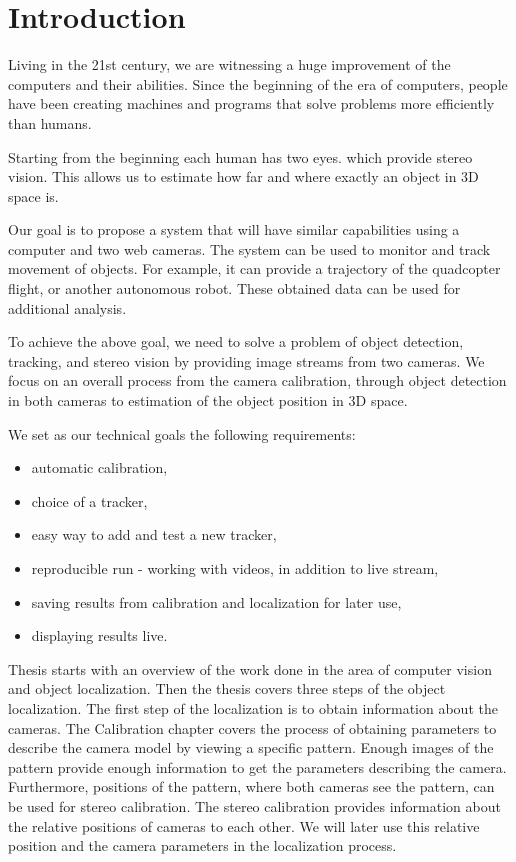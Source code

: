 \chapter*{Introduction}

Living in the 21st century, we are witnessing a huge improvement of the
computers and their abilities. Since the beginning of the era of computers,
people have been creating machines and programs that solve problems more
efficiently than humans.

Starting from the beginning each human has two eyes. which provide stereo
vision. This allows us to estimate how far and where exactly an object in 3D
space is.

Our goal is to propose a system that will have similar capabilities using a
computer and two web cameras. The system can be used to monitor and track
movement of objects. For example, it can provide a trajectory of the quadcopter
flight, or another autonomous robot. These obtained data can be used for
additional analysis.

To achieve the above goal, we need to solve a problem of object detection,
tracking, and stereo vision by providing image streams from two cameras. We
focus on an overall process from the camera calibration, through object
detection in both cameras to estimation of the object position in 3D space.

We set as our technical goals the following requirements:
\begin{itemize}
\item automatic calibration,
\item choice of a tracker,
\item easy way to add and test a new tracker,
\item reproducible run - working with videos, in addition to live stream,
\item saving results from calibration and localization for later use,
\item displaying results live.
\end{itemize}

Thesis starts with an overview of the work done in the area of computer vision
and object localization. Then the thesis covers three steps of the object
localization. The first step of the localization is to obtain information about
the cameras.  The Calibration chapter covers the process of obtaining
parameters to describe the camera model by viewing a specific pattern. Enough
images of the pattern provide enough information to get the parameters
describing the camera.  Furthermore, positions of the pattern, where both
cameras see the pattern, can be used for stereo calibration. The stereo
calibration provides information about the relative positions of cameras to
each other. We will later use this relative position and the camera parameters
in the localization process.

